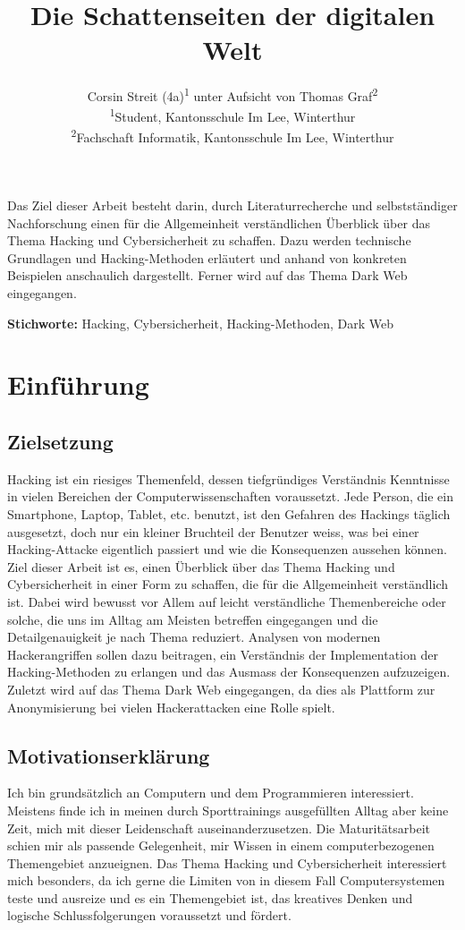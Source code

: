 \documentclass[11pt, a4paper]{article}
\title{\articletype{Hacking und Cybersicherheit} Die Schattenseiten der digitalen Welt}
\author{Corsin Streit (4a)\textsuperscript{1} unter Aufsicht von Thomas Graf\textsuperscript{2} \\
{\footnotesize \textsuperscript{1}Student, Kantonsschule Im Lee, Winterthur} \\
{\footnotesize \textsuperscript{2}Fachschaft Informatik, Kantonsschule Im Lee, Winterthur} \\
}
\date{
	\vspace{12pt}
	\begin{flushleft}
		\normalsize Winterthur, 23. Dezember 2024
	\end{flushleft}
}
\renewenvironment{abstract}
  {\begin{mdframed}[
    backgroundcolor=gray!20, 
    innertopmargin=10pt, 
    innerbottommargin=15pt, 
    innerleftmargin=15pt, 
    innerrightmargin=15pt, 
    linewidth=0pt, 
    roundcorner=0pt,
    frametitleaboveskip=5mm, 
    frametitlebelowskip=-1mm, 
    frametitle={\bfseries Abstrakt}, 
    frametitlefont={\bfseries},
    frametitlealignment=\raggedright
    ]
   \vspace{2mm}}
  {\end{mdframed}}
\newcommand{\keywords}[1]{
  \vspace{12pt} 
  \par\noindent\textbf{Stichworte:} #1
}
\begin{document}
\maketitle
\thispagestyle{firstpage}


\begin{abstract}
Das Ziel dieser Arbeit besteht darin, durch Literaturrecherche und selbstständiger Nachforschung einen für die Allgemeinheit verständlichen Überblick über das Thema Hacking und Cybersicherheit zu schaffen. Dazu werden technische Grundlagen und Hacking-Methoden erläutert und anhand von konkreten Beispielen anschaulich dargestellt. Ferner wird auf das Thema Dark Web eingegangen.
\end{abstract}

\keywords{Hacking, Cybersicherheit, Hacking-Methoden, Dark Web}

\newpage
\tableofcontents
\newpage

\section{Einführung}
\subsection{Zielsetzung}
Hacking ist ein riesiges Themenfeld, dessen tiefgründiges Verständnis Kenntnisse in vielen Bereichen der Computerwissenschaften voraussetzt. Jede Person, die ein Smartphone, Laptop, Tablet, etc. benutzt, ist den Gefahren des Hackings täglich ausgesetzt, doch nur ein kleiner Bruchteil der Benutzer weiss, was bei einer Hacking-Attacke eigentlich passiert und wie die Konsequenzen aussehen können. Ziel dieser Arbeit ist es, einen Überblick über das Thema Hacking und Cybersicherheit in einer Form zu schaffen, die für die Allgemeinheit verständlich ist. Dabei wird bewusst vor Allem auf leicht verständliche Themenbereiche oder solche, die uns im Alltag am Meisten betreffen eingegangen und die Detailgenauigkeit je nach Thema reduziert. Analysen von modernen Hackerangriffen sollen dazu beitragen, ein Verständnis der Implementation der Hacking-Methoden zu erlangen und das Ausmass der Konsequenzen aufzuzeigen. Zuletzt wird auf das Thema Dark Web eingegangen, da dies als Plattform zur Anonymisierung bei vielen Hackerattacken eine Rolle spielt. 

\subsection{Motivationserklärung}
Ich bin grundsätzlich an Computern und dem Programmieren interessiert. Meistens finde ich in meinen durch Sporttrainings ausgefüllten Alltag aber keine Zeit, mich mit dieser Leidenschaft auseinanderzusetzen. Die Maturitätsarbeit schien mir als passende Gelegenheit, mir Wissen in einem computerbezogenen Themengebiet anzueignen. Das Thema Hacking und Cybersicherheit interessiert mich besonders, da ich gerne die Limiten von in diesem Fall Computersystemen teste und ausreize und es ein Themengebiet ist, das kreatives Denken und logische Schlussfolgerungen voraussetzt und fördert.
\end{document}
